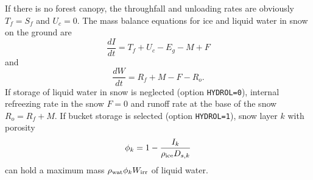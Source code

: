 \documentclass{article}
\begin{document}
If there is no forest canopy, the throughfall and unloading rates are obviously $T_f=S_f$ and $U_c=0$. The mass balance equations for ice and liquid water in snow on the ground are
\begin{equation}
\frac{dI}{dt} = T_f + U_c - E_g - M + F
\end{equation}
and
\begin{equation}
\frac{dW}{dt} = R_f + M - F - R_o.
\end{equation}
If storage of liquid water in snow is neglected (option {\tt HYDROL=0}), internal refreezing rate in the snow $F=0$ and runoff rate at the base of the snow $R_o=R_f+M$. If bucket storage is selected (option {\tt HYDROL=1}), snow layer $k$ with porosity
\begin{equation}
\phi_k = 1 - \frac{I_k}{\rho_{\rm ice}D_{s,k}}
\end{equation}
can hold a maximum mass $\rho_{\rm wat}\phi_k W_{\rm irr}$ of liquid water. 
\end{document}

